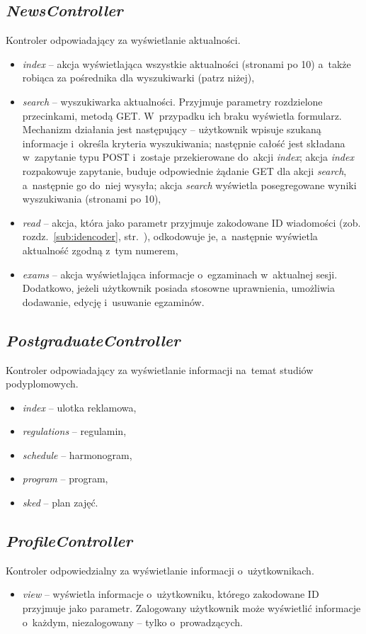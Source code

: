 \documentclass[a4paper,12pt,oneside]{report}
\begin{document}
\subsection{\emph{NewsController}}
\label{con:news}
  Kontroler odpowiadający za wyświetlanie aktualności.
\begin{itemize}
  \item \emph{index} -- akcja wyświetlająca wszystkie aktualności (stronami po 10) a~także robiąca za pośrednika dla wyszukiwarki (patrz niżej),
  \item \emph{search} -- wyszukiwarka aktualności. Przyjmuje parametry rozdzielone przecinkami, metodą GET. W~przypadku ich braku wyświetla formularz. Mechanizm działania jest następujący -- użytkownik wpisuje szukaną informacje i~określa kryteria wyszukiwania; następnie całość jest składana w~zapytanie typu POST i~zostaje przekierowane do~akcji \emph{index}; akcja \emph{index} rozpakowuje zapytanie, buduje odpowiednie żądanie GET dla akcji \emph{search}, a~następnie go do~niej wysyła; akcja \emph{search} wyświetla posegregowane wyniki wyszukiwania (stronami po 10),
  \item \emph{read} -- akcja, która jako parametr przyjmuje zakodowane ID wiadomości (zob. rozdz.~\ref{sub:idencoder}, str.~\pageref{sub:idencoder}), odkodowuje je, a~następnie wyświetla aktualność zgodną z~tym numerem,
  \item \emph{exams} -- akcja wyświetlająca informacje o~egzaminach w~aktualnej sesji. Dodatkowo, jeżeli użytkownik posiada stosowne uprawnienia, umożliwia dodawanie, edycję i~usuwanie egzaminów. 
\end{itemize}

\subsection{\emph{PostgraduateController}}
\label{con:postgraduate}
  Kontroler odpowiadający za wyświetlanie informacji na~temat studiów podyplomowych.
\begin{itemize}
  \item \emph{index} -- ulotka reklamowa,
  \item \emph{regulations} -- regulamin,
  \item \emph{schedule} -- harmonogram,
  \item \emph{program} -- program,
  \item \emph{sked} -- plan zajęć.
\end{itemize}

\subsection{\emph{ProfileController}}
\label{con:profile}
  Kontroler odpowiedzialny za wyświetlanie informacji o~użytkownikach.
\begin{itemize}
  \item \emph{view} -- wyświetla informacje o~użytkowniku, którego zakodowane ID przyjmuje jako parametr. Zalogowany użytkownik może wyświetlić informacje o~każdym, niezalogowany -- tylko o~prowadzących.
\end{itemize}
\end{document}
